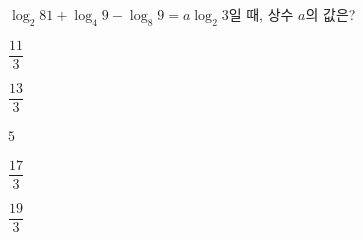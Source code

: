 $\log_2 81+\log_4 9-\log_8 9=a\log_2 3$일 때, 상수 $a$의 값은?
\begin{choices32}{\rule[-3ex]{0pt}{8ex}$\dfrac{11}{3}$}{\rule[-3ex]{0pt}{8ex}$\dfrac{13}{3}$}{\rule[-3ex]{0pt}{8ex}$5$}{\rule[-3ex]{0pt}{8ex}$\dfrac{17}{3}$}{\rule[-3ex]{0pt}{8ex}$\dfrac{19}{3}$}\end{choices32}

